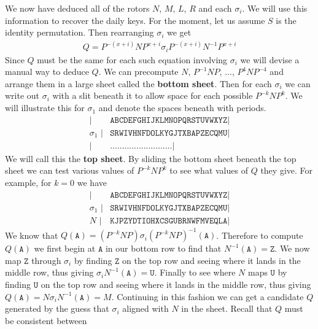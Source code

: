 We now have deduced all of the rotors $N$, $M$, $L$, $R$ and each
$\sigma_i$. We will use this information to recover the daily keys.
For the moment, let us assume $S$ is the identity permutation. Then
rearranging $\sigma_i$ we get
\begin{align}
  Q = P^{-(x+i)}NP^{x+i}\sigma_iP^{-(x+i)}N^{-1}P^{x+i} \label{eq:q_eq}
\end{align}
Since $Q$ must be the same for each such equation involving
$\sigma_i$ we will devise a manual way to deduce $Q$. We can
precompute $N$, $P^{-1}NP$, $\dots$, $P^{4}NP^{-4}$ and arrange them
in a large sheet called the {\bf{bottom sheet}}.
Then for each $\sigma_i$ we can write out $\sigma_i$ with a slit
beneath it to allow space for each possible $P^{-k}NP^k$. We will
illustrate this for $\sigma_1$ and denote the spaces beneath with periods.
\begin{align*}
  \texttt{|}          & \texttt{ABCDEFGHIJKLMNOPQRSTUVWXYZ} \texttt{|} \\
  \sigma_1\texttt{ |} & \texttt{SRWIVHNFDOLKYGJTXBAPZECQMU} \texttt{|} \\
  \texttt{|}          & \texttt{..........................} \texttt{|}
\end{align*}
We will call this the {\bf{top sheet}}. By sliding the bottom sheet
beneath the top sheet we can test various values of $P^{-k}NP^{k}$ to
see what values of $Q$ they give. For example, for $k = 0$ we have
\begin{align*}
  \texttt{|}          & \texttt{ABCDEFGHIJKLMNOPQRSTUVWXYZ} \texttt{|} \\
  \sigma_1\texttt{ |} & \texttt{SRWIVHNFDOLKYGJTXBAPZECQMU} \texttt{|} \\
  N \texttt{ |}       & \texttt{KJPZYDTIOHXCSGUBRNWFMVEQLA} \texttt{|}
\end{align*}
We know that $Q(\texttt{A}) =
(P^{-k}NP)\sigma_i(P^{-k}NP)^{-1}(\texttt{A})$. Therefore to compute
$Q(\texttt{A})$ we first begin at $\texttt{A}$ in our bottom row to
find that $N^{-1}(\texttt{A})=\texttt{Z}$. We now map $\texttt{Z}$
through $\sigma_i$ by finding $\texttt{Z}$ on the top row and seeing
where it lands in the middle row, thus giving
$\sigma_iN^{-1}(\texttt{A}) = \texttt{U}$. Finally to see where $N$
maps $\texttt{U}$ by finding $\texttt{U}$ on the top row and seeing
where it lands in the middle row, thus giving $Q(\texttt{A}) =
N\sigma_iN^{-1}(\texttt{A}) = M$. Continuing in this fashion we can
get a candidate $Q$ generated by the guess that $\sigma_i$ aligned
with $N$ in the sheet. Recall that $Q$ must be consistent between
